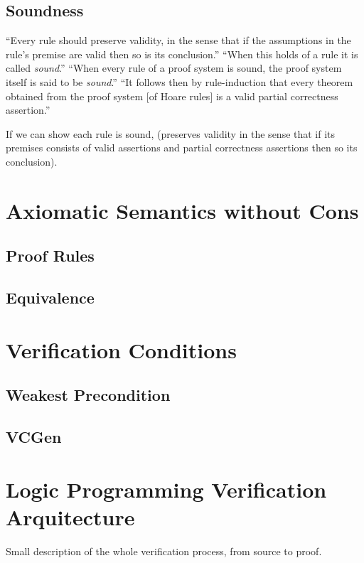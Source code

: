 \subsection{Soundness}

``Every rule should preserve validity, in the sense that if the
assumptions in the rule's premise are valid then so is its conclusion.''
``When this holds of a rule it is called {\it sound}.''
``When every rule of a proof system is sound, the proof system itself is
said to be {\it sound}.''
``It follows then by rule-induction that every theorem obtained from the
proof system [of Hoare rules] is a valid partial correctness
assertion.''




If we can show each rule is sound, (preserves validity in the sense that
if its premises consists of valid assertions and partial correctness
assertions then so its conclusion).

\section{Axiomatic Semantics without Cons}
\label{sec:ax-sem-wo-cons}
\subsection{Proof Rules}



\subsection{Equivalence}

\section{Verification Conditions}
\label{sec:ver-cond}
\subsection{Weakest Precondition}
\subsection{VCGen}

\section{Logic Programming Verification Arquitecture}
\label{sec:ver-arch}
Small description of the whole verification process, from source to
proof.

